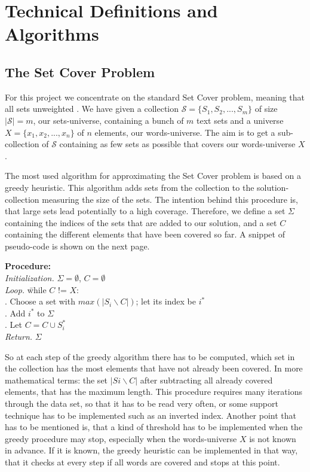 \documentclass[a4paper]{article}
\newcommand{\Sc}{\mathcal{S}}
\begin{document}
\section{Technical Definitions and Algorithms}

\subsection{The Set Cover Problem}
For this project we concentrate on the standard Set Cover problem, meaning that all sets unweighted \cite{Alon2003}. We have given a collection $\Sc = \{S_1,S_2,..., S_m\}$ of size $|\Sc| = m$, our sets-universe, containing a bunch of $m$ text sets and a universe $X = \{x_1, x_2, ..., x_n\}$ of $n$ elements, our words-universe. The aim is to get a sub-collection of $\Sc$ containing as few sets as possible that covers our words-universe $X$.

The most used algorithm for approximating the Set Cover problem is based on a greedy heuristic\cite{Cormode,Feo1995,balas1980set, johnson1974approximation}. This algorithm adds sets from the collection to the solution-collection measuring the size of the sets. The intention behind this procedure is, that large sets lead potentially to a high coverage. Therefore, we define a set $\Sigma$ containing the indices of the sets that are added to our solution, and a set $C$ containing the different elements that have been covered so far. A snippet of pseudo-code is shown on the next page.
\pagebreak

\begin{tabbing}
\textbf{Procedure:}\cite{Cormode} \\
\textit{Initialization.} $\Sigma = \emptyset$, $C = \emptyset$ \\
\textit{Loop.} \= while $C$ != $X$: \\
. Choose a set with $max(|S_i \backslash C|)$; let its index be $i^*$ \\
. Add $i^*$ to $\Sigma$ \\
. Let $C = C \cup S_i^*$ \\
\textit{Return.} $\Sigma$
\end{tabbing}

So at each step of the greedy algorithm there has to be computed, which set in the collection has the most elements that have not already been covered. In more mathematical terms: the set $|Si \backslash C|$ after subtracting all already covered elements, that has the maximum length. This procedure requires many iterations through the data set, so that it has to be read very often, or some support technique has to be implemented such as an inverted index\cite{Cormode}. Another point that has to be mentioned is, that a kind of threshold has to be implemented when the greedy procedure may stop, especially when the words-universe $X$ is not known in advance. If it is known, the greedy heuristic can be implemented in that way, that it checks at every step if all words are covered and stops at this point\cite{balas1980set, Jacobs1995}. 
\end{document}
